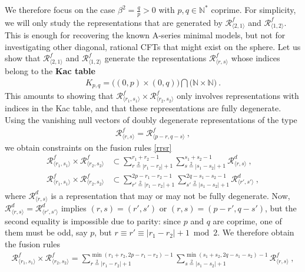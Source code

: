 \documentclass[12pt, a4paper]{article}
\newcommand{\myindex}[1]{\textbf{\boldmath #1}}
\theoremstyle{break}
\begin{document}
We therefore focus on the case $\beta^2 = \frac{q}{p}>0$ with $p,q\in\mathbb{N}^*$ coprime. For simplicity, we will only study the representations that are generated by $\mathcal{R}^f_{\langle 2,1\rangle}$ and $\mathcal{R}^f_{\langle 1,2\rangle}$. This is enough for recovering the known A-series minimal models, but not for investigating other diagonal, rational CFTs that might exist on the sphere. 
Let us show that $\mathcal{R}^f_{\langle 2,1\rangle}$ and $\mathcal{R}^f_{\langle 1,2\rangle}$ generate the representations $\mathcal{R}^f_{\langle r,s\rangle}$  whose indices belong to the \myindex{Kac table}
\begin{align}
 \boxed{ K_{p, q}=  \big((0,p)\times (0,q)\big)\bigcap \big(\mathbb{N}\times \mathbb{N}\big) }\ .
 \label{kac}
\end{align}
This amounts to showing that $\mathcal{R}^f_{\langle r_1,s_1\rangle} \times \mathcal{R}^f_{\langle r_2,s_2\rangle}$ only involves representations with indices in the Kac table, and that these representations are fully degenerate. Using the vanishing null vectors of doubly degenerate representations of the type 
\begin{align}
 \mathcal{R}^f_{\langle r,s\rangle} = \mathcal{R}^f_{\langle p-r,q-s\rangle}\ , 
 \label{prqs}
\end{align}
we obtain constraints on the fusion rules \eqref{rrsr}
\begin{align}
 \mathcal{R}^f_{\langle r_1,s_1\rangle} \times \mathcal{R}^f_{\langle r_2,s_2\rangle} &\subset \sum_{r\overset{2}{=} |r_1-r_2|+1}^{r_1+r_2-1}\sum_{s\overset{2}{=} |s_1-s_2|+1}^{s_1+s_2-1} \mathcal{R}^d_{\langle r,s\rangle} \ , 
 \\
 \mathcal{R}^f_{\langle r_1,s_1\rangle} \times \mathcal{R}^f_{\langle r_2,s_2\rangle} &\subset \sum_{r'\overset{2}{=} |r_1-r_2|+1}^{2p-r_1-r_2-1} \sum_{s'\overset{2}{=} |s_1-s_2|+1}^{2q-s_1-s_2-1}\mathcal{R}^d_{\langle r',s'\rangle} \ , 
\end{align}
where $\mathcal{R}^d_{\langle r,s\rangle}$ is a representation that may or may not be fully degenerate. Now, $\mathcal{R}^d_{\langle r,s\rangle} = \mathcal{R}^d_{\langle r',s'\rangle}$ implies $(r,s)=(r',s')$ or $(r,s)=(p-r',q-s')$, but the second equality is impossible due to parity: since $p$ and $q$ are coprime, one of them must be odd, say $p$, but $r\equiv r'\equiv |r_1-r_2|+1\bmod 2$. We therefore obtain the fusion rules 
\begin{align}
 \boxed{\mathcal{R}^f_{\langle r_1,s_1\rangle} \times \mathcal{R}^f_{\langle r_2,s_2\rangle} = \sum_{r\overset{2}{=} |r_1-r_2|+1}^{\min(r_1+r_2,2p-r_1-r_2)-1}\sum_{s\overset{2}{=} |s_1-s_2|+1}^{\min(s_1+s_2,2q-s_1-s_2)-1} \mathcal{R}^f_{\langle r,s\rangle}} \ , 
 \label{rfrf}
\end{align}
\end{document}
